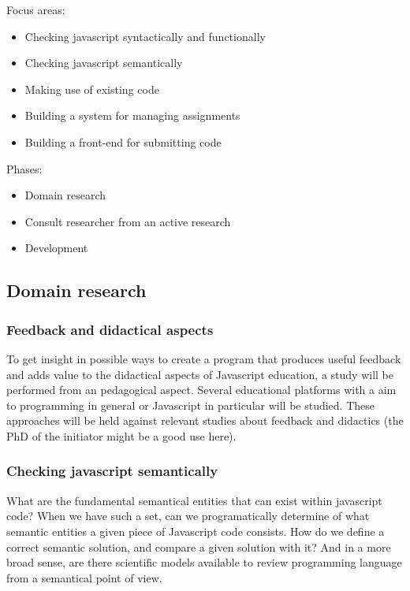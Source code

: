 \documentclass{article}
\begin{document}
Focus areas:
\begin{itemize}
  \item Checking javascript syntactically and functionally
  \item Checking javascript semantically
  \item Making use of existing code
  \item Building a system for managing assignments
  \item Building a front-end for submitting code
\end{itemize}

Phases:
\begin{itemize}
  \item Domain research
  \item Consult researcher from an active research
  \item Development
\end{itemize}


\subsection{Domain research}

\subsubsection{Feedback and didactical aspects}
To get insight in possible ways to create a program that produces useful feedback and adds value to the didactical aspects of Javascript education, a study will be performed from an pedagogical aspect. Several educational platforms with a aim to programming in general or Javascript in particular will be studied. These approaches will be held against relevant studies about feedback and didactics (the PhD of the initiator might be a good use here).
\subsubsection{Checking javascript semantically}
What are the fundamental semantical entities that can exist within javascript code? When we have such a set, can we programatically determine of what semantic entities a given piece of Javascript code consists. How do we define a correct semantic solution, and compare a given solution with it? And in a more broad sense, are there scientific models available to review programming language from a semantical point of view.
\end{document}
